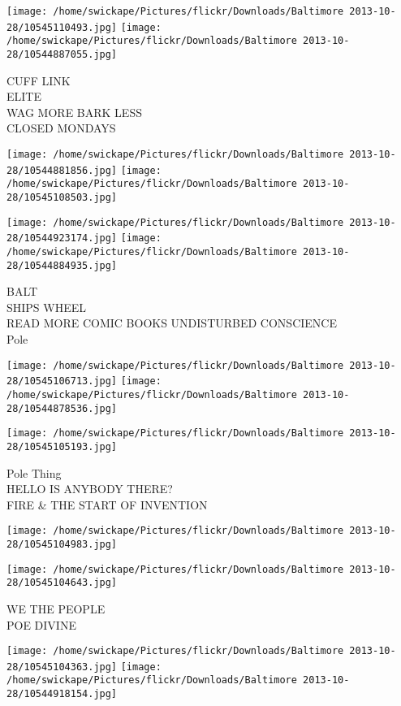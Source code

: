 \documentclass[10pt,letterpaper]{article}
\begin{document}
\texttt{[image: /home/swickape/Pictures/flickr/Downloads/Baltimore 2013-10-28/10545110493.jpg]}
\texttt{[image: /home/swickape/Pictures/flickr/Downloads/Baltimore 2013-10-28/10544887055.jpg]}

CUFF LINK\\
ELITE\\
WAG MORE BARK LESS\\
CLOSED MONDAYS\\
\pagebreak

\texttt{[image: /home/swickape/Pictures/flickr/Downloads/Baltimore 2013-10-28/10544881856.jpg]}
\texttt{[image: /home/swickape/Pictures/flickr/Downloads/Baltimore 2013-10-28/10545108503.jpg]}

\texttt{[image: /home/swickape/Pictures/flickr/Downloads/Baltimore 2013-10-28/10544923174.jpg]}
\texttt{[image: /home/swickape/Pictures/flickr/Downloads/Baltimore 2013-10-28/10544884935.jpg]}

BALT\\
SHIPS WHEEL\\
READ MORE COMIC BOOKS UNDISTURBED CONSCIENCE\\
Pole\\
\pagebreak

\texttt{[image: /home/swickape/Pictures/flickr/Downloads/Baltimore 2013-10-28/10545106713.jpg]}
\texttt{[image: /home/swickape/Pictures/flickr/Downloads/Baltimore 2013-10-28/10544878536.jpg]}

\vspace{0.25in}
\texttt{[image: /home/swickape/Pictures/flickr/Downloads/Baltimore 2013-10-28/10545105193.jpg]}

Pole Thing\\
HELLO IS ANYBODY THERE?\\
FIRE \& THE START OF INVENTION\\
\pagebreak

\texttt{[image: /home/swickape/Pictures/flickr/Downloads/Baltimore 2013-10-28/10545104983.jpg]}

\vspace{0.25in}
\texttt{[image: /home/swickape/Pictures/flickr/Downloads/Baltimore 2013-10-28/10545104643.jpg]}

WE THE PEOPLE\\
POE DIVINE\\
\pagebreak

\texttt{[image: /home/swickape/Pictures/flickr/Downloads/Baltimore 2013-10-28/10545104363.jpg]}
\texttt{[image: /home/swickape/Pictures/flickr/Downloads/Baltimore 2013-10-28/10544918154.jpg]}
\end{document}
